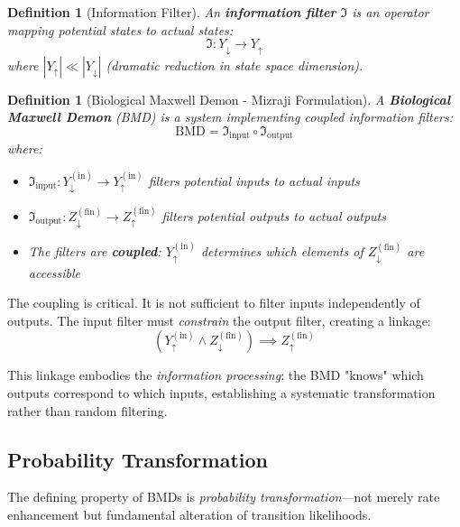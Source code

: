 \documentclass[11pt]{article}
\newtheorem{definition}[theorem]{Definition}
\theoremstyle{remark}
\begin{document}
\begin{definition}[Information Filter]
\label{def:info_filter}
An \textbf{information filter} $\Im$ is an operator mapping potential states to actual states:
\begin{equation}
\Im: Y_{\downarrow} \to Y_{\uparrow}
\end{equation}
where $|Y_{\uparrow}| \ll |Y_{\downarrow}|$ (dramatic reduction in state space dimension).
\end{definition}

\begin{definition}[Biological Maxwell Demon - Mizraji Formulation]
\label{def:bmd_mizraji}
A \textbf{Biological Maxwell Demon} (BMD) is a system implementing coupled information filters:
\begin{equation}
\text{BMD} = \Im_{\text{input}} \circ \Im_{\text{output}}
\end{equation}
where:
\begin{itemize}
\item $\Im_{\text{input}}: Y_{\downarrow}^{(\text{in})} \to Y_{\uparrow}^{(\text{in})}$ filters potential inputs to actual inputs
\item $\Im_{\text{output}}: Z_{\downarrow}^{(\text{fin})} \to Z_{\uparrow}^{(\text{fin})}$ filters potential outputs to actual outputs
\item The filters are \textbf{coupled}: $Y_{\uparrow}^{(\text{in})}$ determines which elements of $Z_{\downarrow}^{(\text{fin})}$ are accessible
\end{itemize}
\end{definition}

The coupling is critical. It is not sufficient to filter inputs independently of outputs. The input filter must \textit{constrain} the output filter, creating a linkage:
\begin{equation}
(Y_{\uparrow}^{(\text{in})} \wedge Z_{\downarrow}^{(\text{fin})}) \implies Z_{\uparrow}^{(\text{fin})}
\end{equation}

This linkage embodies the \textit{information processing}: the BMD "knows" which outputs correspond to which inputs, establishing a systematic transformation rather than random filtering.

\subsection{Probability Transformation}

The defining property of BMDs is \textit{probability transformation}—not merely rate enhancement but fundamental alteration of transition likelihoods.
\end{document}
